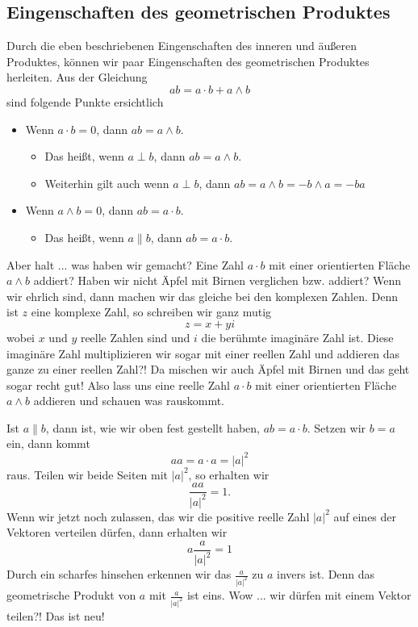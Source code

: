 \documentclass[fleqn]{scrartcl}
\numberwithin{equation}{section}
\begin{document}
\subsection{Eingenschaften des geometrischen Produktes}
Durch die eben beschriebenen Eingenschaften des inneren und äußeren Produktes,
können wir paar Eingenschaften des geometrischen Produktes herleiten. Aus der
Gleichung
\[ab = a\cdot b + a\wedge b\]
sind folgende Punkte ersichtlich
\begin{itemize}
\item Wenn $a \cdot b = 0$, dann $ab = a \wedge b$.
  \begin{itemize}
  \item Das heißt, wenn $a \perp b$, dann $ab = a\wedge b$.
  \item Weiterhin gilt auch wenn $a \perp b$, dann $ab = a \wedge b = - b
      \wedge a = -ba$
  \end{itemize}
\item Wenn $a\wedge b = 0$, dann $ab = a \cdot b$.
  \begin{itemize}
  \item Das heißt, wenn $a \parallel b$, dann $ab = a \cdot b$.
  \end{itemize}
\end{itemize}

Aber halt ... was haben wir gemacht? Eine Zahl $a\cdot b$ mit einer orientierten
Fläche $a\wedge b$ addiert? Haben wir nicht Äpfel mit Birnen verglichen bzw.
addiert? Wenn wir ehrlich sind, dann machen wir das gleiche bei den komplexen
Zahlen. Denn ist $z$ eine komplexe Zahl, so schreiben wir ganz mutig
\[z=x+yi\]
wobei $x$ und $y$ reelle Zahlen sind und $i$ die berühmte imaginäre Zahl ist.
Diese imaginäre Zahl multiplizieren wir sogar mit einer reellen Zahl und
addieren das ganze zu einer reellen Zahl?! Da mischen wir auch Äpfel mit
Birnen und das geht sogar recht gut! Also lass uns eine reelle Zahl $a\cdot b$
mit einer orientierten Fläche $a\wedge b$ addieren und schauen was rauskommt.

Ist $a \parallel b$, dann ist, wie wir oben fest gestellt haben, $ab = a
\cdot b$. Setzen wir $b=a$ ein, dann kommt
\[aa=a\cdot a = |a|^2\]
raus. Teilen wir beide Seiten mit $|a|^2$, so erhalten wir
\[\frac{aa}{|a|^2}=1.\]
Wenn wir jetzt noch zulassen, das wir die positive reelle Zahl $|a|^2$ auf
eines der Vektoren verteilen dürfen, dann erhalten wir
\[a\frac{a}{|a|^2}=1\]
Durch ein scharfes hinsehen erkennen wir das $\frac{a}{|a|^2}$ zu $a$ invers
ist. Denn das geometrische Produkt von $a$ mit $\frac{a}{|a|^2}$ ist eins. Wow
... wir dürfen mit einem Vektor teilen?! Das ist neu!
\end{document}
